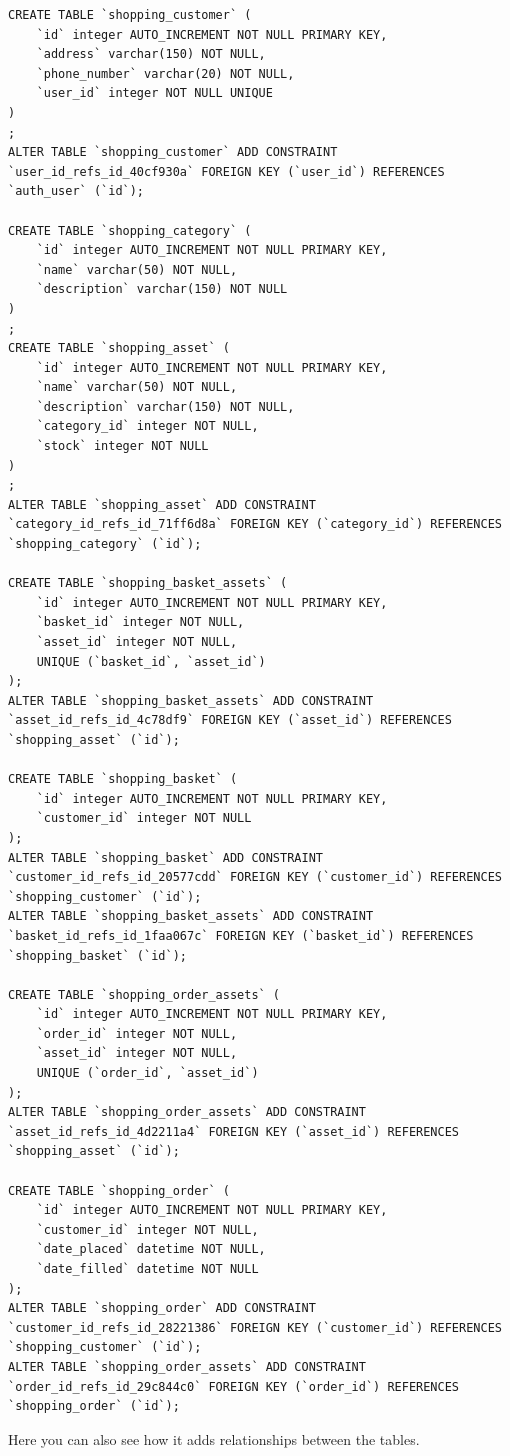 \documentclass[12pt, a4paper,titlepage]{article}
\begin{document}
\lstset{language=SQL}
\begin{lstlisting}
CREATE TABLE `shopping_customer` (
    `id` integer AUTO_INCREMENT NOT NULL PRIMARY KEY,
    `address` varchar(150) NOT NULL,
    `phone_number` varchar(20) NOT NULL,
    `user_id` integer NOT NULL UNIQUE
)
;
ALTER TABLE `shopping_customer` ADD CONSTRAINT `user_id_refs_id_40cf930a` FOREIGN KEY (`user_id`) REFERENCES `auth_user` (`id`);

CREATE TABLE `shopping_category` (
    `id` integer AUTO_INCREMENT NOT NULL PRIMARY KEY,
    `name` varchar(50) NOT NULL,
    `description` varchar(150) NOT NULL
)
;
CREATE TABLE `shopping_asset` (
    `id` integer AUTO_INCREMENT NOT NULL PRIMARY KEY,
    `name` varchar(50) NOT NULL,
    `description` varchar(150) NOT NULL,
    `category_id` integer NOT NULL,
    `stock` integer NOT NULL
)
;
ALTER TABLE `shopping_asset` ADD CONSTRAINT `category_id_refs_id_71ff6d8a` FOREIGN KEY (`category_id`) REFERENCES `shopping_category` (`id`);

CREATE TABLE `shopping_basket_assets` (
    `id` integer AUTO_INCREMENT NOT NULL PRIMARY KEY,
    `basket_id` integer NOT NULL,
    `asset_id` integer NOT NULL,
    UNIQUE (`basket_id`, `asset_id`)
);
ALTER TABLE `shopping_basket_assets` ADD CONSTRAINT `asset_id_refs_id_4c78df9` FOREIGN KEY (`asset_id`) REFERENCES `shopping_asset` (`id`);

CREATE TABLE `shopping_basket` (
    `id` integer AUTO_INCREMENT NOT NULL PRIMARY KEY,
    `customer_id` integer NOT NULL
);
ALTER TABLE `shopping_basket` ADD CONSTRAINT `customer_id_refs_id_20577cdd` FOREIGN KEY (`customer_id`) REFERENCES `shopping_customer` (`id`);
ALTER TABLE `shopping_basket_assets` ADD CONSTRAINT `basket_id_refs_id_1faa067c` FOREIGN KEY (`basket_id`) REFERENCES `shopping_basket` (`id`);

CREATE TABLE `shopping_order_assets` (
    `id` integer AUTO_INCREMENT NOT NULL PRIMARY KEY,
    `order_id` integer NOT NULL,
    `asset_id` integer NOT NULL,
    UNIQUE (`order_id`, `asset_id`)
);
ALTER TABLE `shopping_order_assets` ADD CONSTRAINT `asset_id_refs_id_4d2211a4` FOREIGN KEY (`asset_id`) REFERENCES `shopping_asset` (`id`);

CREATE TABLE `shopping_order` (
    `id` integer AUTO_INCREMENT NOT NULL PRIMARY KEY,
    `customer_id` integer NOT NULL,
    `date_placed` datetime NOT NULL,
    `date_filled` datetime NOT NULL
);
ALTER TABLE `shopping_order` ADD CONSTRAINT `customer_id_refs_id_28221386` FOREIGN KEY (`customer_id`) REFERENCES `shopping_customer` (`id`);
ALTER TABLE `shopping_order_assets` ADD CONSTRAINT `order_id_refs_id_29c844c0` FOREIGN KEY (`order_id`) REFERENCES `shopping_order` (`id`);
\end{lstlisting} 
Here you can also see how it adds relationships between the tables.
\end{document}
